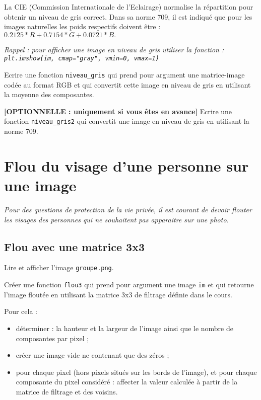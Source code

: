 La CIE (Commission Internationale de l’Eclairage) normalise la répartition pour obtenir un niveau de gris correct. Dans sa norme 709, il est indiqué que pour les images naturelles les poids respectifs doivent être : $0.2125 * R + 0.7154 * G + 0.0721 * B.$

\textit{Rappel : pour afficher une image en niveau de gris utiliser la fonction : \texttt{plt.imshow(im, cmap="gray", vmin=0, vmax=1)}}

\begin{question}
Ecrire une fonction \texttt{niveau\_gris} qui prend pour argument une matrice-image codée au format RGB et qui convertit cette image en niveau de gris en utilisant la moyenne des composantes.
\end{question}

\begin{question} \textbf{[OPTIONNELLE : uniquement si vous êtes en avance]}
Ecrire une fonction \texttt{niveau\_gris2} qui convertit une image en niveau de gris en utilisant la norme 709.
\end{question}





\section*{Flou du visage d'une personne sur une image}


\textit{Pour des questions de protection de la vie privée, il est courant de devoir flouter les visages des personnes qui ne souhaitent pas apparaitre sur une photo. }


\subsection*{Flou avec une matrice 3x3}

\begin{question}
Lire et afficher l'image \texttt{groupe.png}.
\end{question}

\begin{question}
Créer une fonction \texttt{flou3} qui prend pour argument une image \texttt{im} et qui retourne l'image floutée en utilisant la matrice 3x3 de filtrage définie dans le cours.
\end{question}

Pour cela :
\begin{itemize}
\item déterminer : la hauteur et  la largeur de l'image ainsi que le nombre de composantes par pixel ;
\item créer une image vide ne contenant que des zéros ;
\item pour chaque pixel (hors pixels situés sur les bords de l'image), et pour chaque composante du pixel considéré :  affecter la valeur calculée à partir de la matrice de filtrage et des voisins.
\end{itemize}

